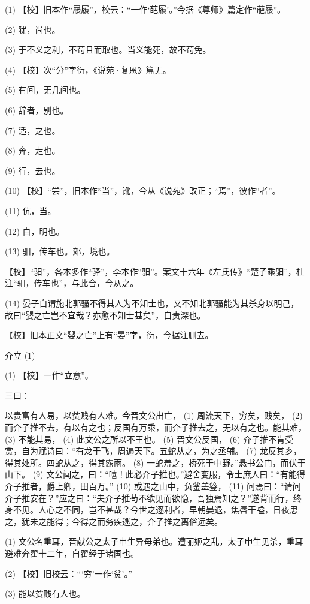 \documentclass[12pt,UTF8]{ctexbook}
\begin{document}
(1) 【校】旧本作“屦履”，校云：“一作‘葩履’。”今据《尊师》篇定作“萉屦”。

(2) 犹，尚也。

(3) 于不义之利，不苟且而取也。当义能死，故不苟免。

(4) 【校】次“分”字衍，《说苑·复恩》篇无。

(5) 有间，无几间也。

(6) 辞者，别也。

(7) 适，之也。

(8) 奔，走也。

(9) 行，去也。

(10) 【校】“尝”，旧本作“当”，讹，今从《说苑》改正；“焉”，彼作“者”。

(11) 伉，当。

(12) 白，明也。

(13) 驲，传车也。郊，境也。

【校】“驲”，各本多作“驿”，李本作“驲”。案文十六年《左氏传》“楚子乘驲”，杜注“驲，传车也”，与此合，今从之。

(14) 晏子自谓施北郭骚不得其人为不知士也，又不知北郭骚能为其杀身以明己，故曰“婴之亡岂不宜哉？亦愈不知士甚矣”，自责深也。

【校】旧本正文“婴之亡”上有“晏”字，衍，今据注删去。





介立 (1)


(1) 【校】一作“立意”。

三曰：

以贵富有人易，以贫贱有人难。今晋文公出亡， (1) 周流天下，穷矣，贱矣， (2) 而介子推不去，有以有之也；反国有万乘，而介子推去之，无以有之也。能其难， (3) 不能其易， (4) 此文公之所以不王也。 (5) 晋文公反国， (6) 介子推不肯受赏，自为赋诗曰：“有龙于飞，周遍天下。五蛇从之，为之丞辅。 (7) 龙反其乡，得其处所。四蛇从之，得其露雨。 (8) 一蛇羞之，桥死于中野。”悬书公门，而伏于山下。 (9) 文公闻之，曰：“嘻！此必介子推也。”避舍变服，令士庶人曰：“有能得介子推者，爵上卿，田百万。” (10) 或遇之山中，负釜盖簦， (11) 问焉曰：“请问介子推安在？”应之曰：“夫介子推苟不欲见而欲隐，吾独焉知之？”遂背而行，终身不见。人心之不同，岂不甚哉？今世之逐利者，早朝晏退，焦唇干嗌，日夜思之，犹未之能得；今得之而务疾逃之，介子推之离俗远矣。

(1) 文公名重耳，晋献公之太子申生异母弟也。遭丽姬之乱，太子申生见杀，重耳避难奔翟十二年，自翟经于诸国也。

(2) 【校】旧校云：“‘穷’一作‘贫’。”

(3) 能以贫贱有人也。
\end{document}
